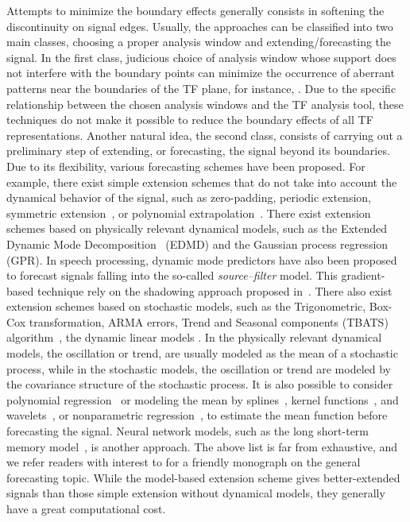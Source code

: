 \documentclass[journal]{IEEEtran}
\begin{document}
Attempts to minimize the boundary effects generally consists in softening the discontinuity on signal edges. Usually, the approaches can be classified into two main classes, choosing a proper analysis window and extending/forecasting the signal. In the first class, judicious choice of analysis window whose support does not interfere with the boundary points can minimize the occurrence of aberrant patterns near the boundaries of the TF plane, for instance, \cite{Chui92wavelets,Depczynski99fast}. Due to the specific relationship between the chosen analysis windows and the TF analysis tool, these techniques do not make it possible to reduce the boundary effects of all TF representations. 
%
Another natural idea, the second class, consists of carrying out a preliminary step of extending, or forecasting, the signal beyond its boundaries. Due to its flexibility, various forecasting schemes have been proposed. For example, there exist simple extension schemes that do not take into account the dynamical behavior of the signal, such as zero-padding, periodic extension, symmetric extension~\cite{Kharitonenko02wavelet,Chen95symmetric}, or polynomial extrapolation~\cite{Williams97discrete}. 
%
There exist extension schemes based on physically relevant dynamical models, such as the Extended Dynamic Mode Decomposition~\cite{Williams15data} (EDMD) and the Gaussian process regression~\cite{Rasmussen06gaussian,Roberts13Gaussian} (GPR).
% 
In speech processing, dynamic mode predictors have also been proposed~\cite{Vargas11speech} to forecast signals falling into the so-called \textit{source--filter} model. This gradient-based technique rely on the shadowing approach proposed in~\cite{Grebogi90shadowing}. 
%
There also exist extension schemes based on stochastic models, such as the Trigonometric, Box-Cox transformation, ARMA errors, Trend and Seasonal components (TBATS) algorithm~\cite{DeLivera11forecasting}, the dynamic linear models \cite{west2006bayesian}. 
%
In the physically relevant dynamical models, the oscillation or trend, are usually modeled as the mean of a stochastic process, while in the stochastic models, the oscillation or trend are modeled by the covariance structure of the stochastic process. 
It is also possible to consider polynomial regression~\cite{fan1996local} or modeling the mean by splines~\cite{hall2005theory}, kernel functions~\cite{chang2010training}, and wavelets~\cite{marron1998exact}, or nonparametric regression~\cite{fan1996local}, to estimate the mean function before forecasting the signal. Neural network models, such as the long short-term memory model~\cite{vlachas2018data}, is another approach. 
%
The above list is far from exhaustive, and we refer readers with interest to \cite{hyndman2018forecasting} for a friendly monograph on the general forecasting topic. 
%
While the model-based extension scheme gives better-extended signals than those simple extension without dynamical models, they generally have a great computational cost. 
\end{document}
